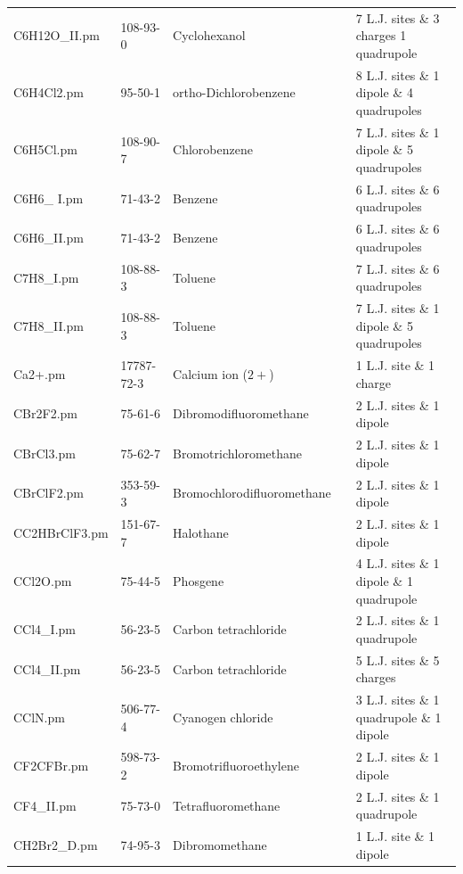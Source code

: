 \begin{landscape}
\begin{longtable}{lllll}
	C6H12O\_II.pm & 108-93-0 & Cyclohexanol & \parencite{Merker2009} & 7 L.J. sites \& 3 charges 1 quadrupole \\
	C6H4Cl2.pm & 95-50-1 & ortho-Dichlorobenzene & \parencite{Huang2011} & 8 L.J. sites \& 1 dipole \& 4 quadrupoles \\
	C6H5Cl.pm & 108-90-7 & Chlorobenzene & \parencite{Huang2011} & 7 L.J. sites \& 1 dipole \& 5 quadrupoles \\
	C6H6\_ I.pm & 71-43-2 & Benzene & \parencite{Guevara-Carrion2016} & 6 L.J. sites \& 6 quadrupoles \\
	C6H6\_II.pm & 71-43-2 & Benzene & \parencite{Huang2011} & 6 L.J. sites \& 6 quadrupoles \\
	C7H8\_I.pm & 108-88-3 & Toluene & \parencite{Guevara-Carrion2016} & 7 L.J. sites \& 6 quadrupoles \\
	C7H8\_II.pm & 108-88-3 & Toluene & \parencite{Huang2011} & 7 L.J. sites \& 1 dipole \& 5 quadrupoles \\
	Ca2+.pm & 17787-72-3 & Calcium ion ($2+$) & \parencite{Deublein2012_A} & 1 L.J. site \& 1 charge \\
	CBr2F2.pm & 75-61-6 & Dibromodifluoromethane & \parencite{Stoll2003} & 2 L.J. sites \& 1 dipole \\
	CBrCl3.pm & 75-62-7 & Bromotrichloromethane & \parencite{Stoll2003} & 2 L.J. sites \& 1 dipole \\
	CBrClF2.pm & 353-59-3 & Bromochlorodifluoromethane & \parencite{Stoll2003} & 2 L.J. sites \& 1 dipole \\
	CC2HBrClF3.pm & 151-67-7 & Halothane & \parencite{Stoll2003} & 2 L.J. sites \& 1 dipole \\
	CCl2O.pm & 75-44-5 & Phosgene & \parencite{Huang2011} & 4 L.J. sites \& 1 dipole \& 1 quadrupole \\
	CCl4\_I.pm & 56-23-5 & Carbon tetrachloride & \parencite{Vrabec2001} & 2 L.J. sites \& 1 quadrupole \\
	CCl4\_II.pm & 56-23-5 & Carbon tetrachloride & \parencite{Guevara-Carrion2016} & 5 L.J. sites \& 5 charges \\
	CClN.pm & 506-77-4 & Cyanogen chloride & \parencite{Miroshnichenko2013} & 3 L.J. sites \& 1 quadrupole \& 1 dipole \\
	CF2CFBr.pm & 598-73-2 & Bromotrifluoroethylene  & \parencite{Stoll2003} & 2 L.J. sites \& 1 dipole \\
	CF4\_II.pm & 75-73-0 & Tetrafluoromethane & \parencite{Vrabec2001} & 2 L.J. sites \& 1 quadrupole \\
	CH2Br2\_D.pm & 74-95-3 & Dibromomethane & \parencite{Stoll2003} & 1 L.J. site \& 1 dipole \\

\end{longtable}
\end{landscape}
